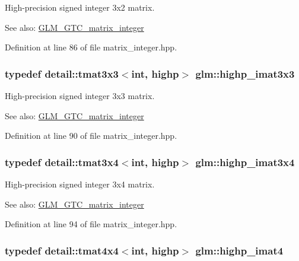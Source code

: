 High-precision signed integer 3x2 matrix. \begin{Desc}
\item[See also:]\hyperlink{group__gtc__matrix__integer}{GLM\_\-GTC\_\-matrix\_\-integer} \end{Desc}


Definition at line 86 of file matrix\_\-integer.hpp.\hypertarget{group__gtc__matrix__integer_g4e7c11e49de5d71067b95a87c84308a8}{
\subsubsection[highp\_\-imat3x3]{\setlength{\rightskip}{0pt plus 5cm}typedef detail::tmat3x3$<$int, highp$>$ {\bf glm::highp\_\-imat3x3}}}
\label{group__gtc__matrix__integer_g4e7c11e49de5d71067b95a87c84308a8}


High-precision signed integer 3x3 matrix. \begin{Desc}
\item[See also:]\hyperlink{group__gtc__matrix__integer}{GLM\_\-GTC\_\-matrix\_\-integer} \end{Desc}


Definition at line 90 of file matrix\_\-integer.hpp.\hypertarget{group__gtc__matrix__integer_g97ddf84f7ae0c5d4d3ecc18bb1d47449}{
\subsubsection[highp\_\-imat3x4]{\setlength{\rightskip}{0pt plus 5cm}typedef detail::tmat3x4$<$int, highp$>$ {\bf glm::highp\_\-imat3x4}}}
\label{group__gtc__matrix__integer_g97ddf84f7ae0c5d4d3ecc18bb1d47449}


High-precision signed integer 3x4 matrix. \begin{Desc}
\item[See also:]\hyperlink{group__gtc__matrix__integer}{GLM\_\-GTC\_\-matrix\_\-integer} \end{Desc}


Definition at line 94 of file matrix\_\-integer.hpp.\hypertarget{group__gtc__matrix__integer_g9ca2f5624891bd1ac993fcde4dd24ac1}{
\subsubsection[highp\_\-imat4]{\setlength{\rightskip}{0pt plus 5cm}typedef detail::tmat4x4$<$int, highp$>$ {\bf glm::highp\_\-imat4}}}
\label{group__gtc__matrix__integer_g9ca2f5624891bd1ac993fcde4dd24ac1}


